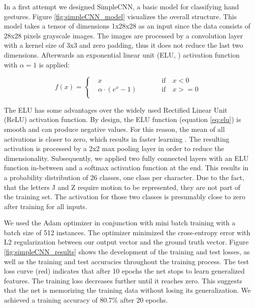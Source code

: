 \documentclass[a4paper]{article}
\begin{document}
In a first attempt we designed SimpleCNN, a basic model for classifying hand gestures. Figure \ref{fig:simpleCNN_model} visualizes the overall structure. This model takes a tensor of dimensions 1x28x28 as an input since the data consists of 28x28 pixels grayscale images. The images are processed by a convolution layer with a kernel size of 3x3 and zero padding, thus it does not reduce the last two dimensions. Afterwards an exponential linear unit (ELU, \cite{clevert2015fast}) activation function with $\alpha = 1$ is applied:
\vspace{-0.2cm}

\begin{equation}\label{eq:elu}
f(x) = \left\{\begin{alignedat}{2}
    & x && \qquad \text{if} \quad x < 0\\
    & \alpha \cdot (e^x - 1) && \qquad \text{if} \quad x >= 0\\
  \end{alignedat}\right.
\end{equation}

The ELU has some advantages over the widely used Rectified Linear Unit (ReLU) activation function. By design, the ELU function (equation \ref{eq:elu}) is smooth and can produce negative values. For this reason, the mean of all activations is closer to zero, which results in faster learning \cite{clevert2015fast}.
The resulting activation is processed by a 2x2 max pooling layer in order to reduce the dimensionality. Subsequently, we applied two fully connected layers with an ELU function in-between and a softmax activation function at the end. This results in a probability distribution of 26 classes, one class per character. Due to the fact, that the letters J and Z require motion to be represented, they are not part of the training set. The activation for those two classes is presumably close to zero after training for all inputs.

We used the Adam optimizer \cite{Kingma2014} in conjunction with mini batch training with a batch size of 512 instances. The optimizer minimized the cross-entropy error with L2 regularization between our output vector and the ground truth vector. 
Figure \ref{fig:simpleCNN_results} shows the development of the training and test losses, as well as the training and test accuracies throughout the training process. The test loss curve (red) indicates that after 10 epochs the net stops to learn generalized features. The training loss decreases further until it reaches zero. This suggests that the net is memorizing the training data without losing its generalization. We achieved a training accuracy of 80.7\% after 20 epochs.
\end{document}
